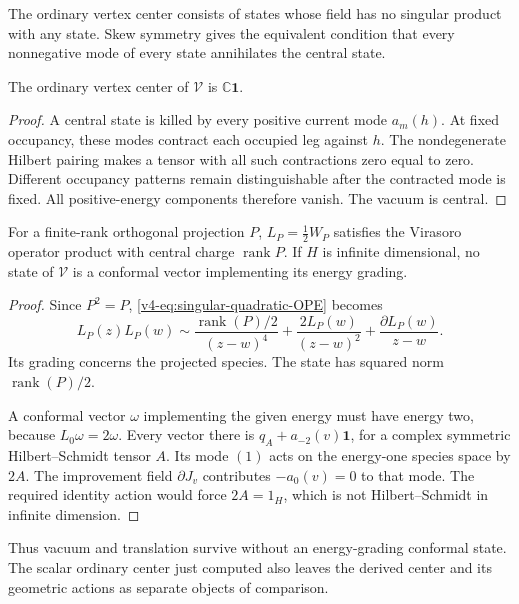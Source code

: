 The ordinary vertex center consists of states
whose field has no singular product with any
state. Skew symmetry gives the equivalent
condition that every nonnegative mode of every
state annihilates the central state.

\begin{proposition}\label{v4-prop:singular-ordinary-centre}
The ordinary vertex center of \(\mathcal V\)
is \(\mathbb C\mathbf1\).
\end{proposition}

\begin{proof}
A central state is killed by every positive
current mode \(a_m(h)\). At fixed occupancy,
these modes contract each occupied leg against
\(h\). The nondegenerate Hilbert pairing makes
a tensor with all such contractions zero equal
to zero. Different occupancy patterns remain
distinguishable after the contracted mode is
fixed. All positive-energy components therefore
vanish. The vacuum is central.
\end{proof}

\begin{proposition}\label{v4-prop:singular-conformal-boundary}
For a finite-rank orthogonal projection \(P\),
\(L_P=\tfrac12W_P\) satisfies the Virasoro
operator product with central charge
\(\operatorname{rank}P\). If \(H\) is infinite
dimensional, no state of \(\mathcal V\) is a
conformal vector implementing its energy grading.
\end{proposition}

\begin{proof}
Since \(P^2=P\),
\eqref{v4-eq:singular-quadratic-OPE} becomes
\[
 L_P(z)L_P(w)\sim
  \frac{\operatorname{rank}(P)/2}{(z-w)^4}
       +\frac{2L_P(w)}{(z-w)^2}
       +\frac{\partial L_P(w)}{z-w}.
\]
Its grading concerns the projected species.
The state has squared norm
\(\operatorname{rank}(P)/2\).

A conformal vector \(\omega\) implementing the
given energy must have energy two, because
\(L_0\omega=2\omega\). Every vector there is
\(q_A+a_{-2}(v)\mathbf1\), for a complex
symmetric Hilbert--Schmidt tensor \(A\).
Its mode \((1)\) acts on the energy-one species
space by \(2A\). The improvement field
\(\partial J_v\) contributes
\(-a_0(v)=0\) to that mode.
The required identity action would force
\(2A=1_H\), which is not Hilbert--Schmidt
in infinite dimension.
\end{proof}

Thus vacuum and translation survive without an
energy-grading conformal state. The scalar
ordinary center just computed also leaves the
derived center and its geometric actions as
separate objects of comparison.

